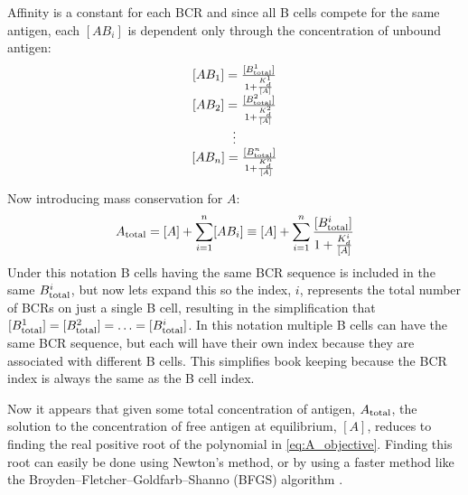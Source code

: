 \noindent
Affinity is a constant for each BCR and since all B cells compete for the same antigen, each $[AB_i]$ is dependent only through the concentration of unbound antigen:
\[
 \begin{matrix}
  [AB_1] = \frac{[B^1_{\text{total}}]}{1 + \frac{K^1_d}{[A]}} \\
  [AB_2] = \frac{[B^2_{\text{total}}]}{1 + \frac{K^2_d}{[A]}} \\
  \vdots \\
  [AB_n] = \frac{[B^n_{\text{total}}]}{1 + \frac{K^n_d}{[A]}} \\
 \end{matrix}
\]

\noindent
Now introducing mass conservation for $A$:
\begin{equation}
A_{\text{total}} = [A] + \sum_{i=1}^{n} [AB_i] \equiv [A] + \sum_{i=1}^{n} \frac{[B^i_{\text{total}}]}{1 + \frac{K^i_d}{[A]}}
  \label{eq:A_objective}
\end{equation}
Under this notation B cells having the same BCR sequence is included in the same $B^i_{\text{total}}$, but now lets expand this so the index, $i$, represents the total number of BCRs on just a single B cell, resulting in the simplification that $[B^1_{\text{total}}] = [B^2_{\text{total}}] = \ldots = [B^i_{\text{total}}]$.
In this notation multiple B cells can have the same BCR sequence, but each will have their own index because they are associated with different B cells. 
This simplifies book keeping because the BCR index is always the same as the B cell index.

Now it appears that given some total concentration of antigen, $A_{\text{total}}$, the solution to the concentration of free antigen at equilibrium, $[A]$, reduces to finding the real positive root of the polynomial in \eqref{eq:A_objective}.
Finding this root can easily be done using Newton's method, or by using a faster method like the Broyden–Fletcher–Goldfarb–Shanno (BFGS) algorithm \cite{shanno1985broyden}.





